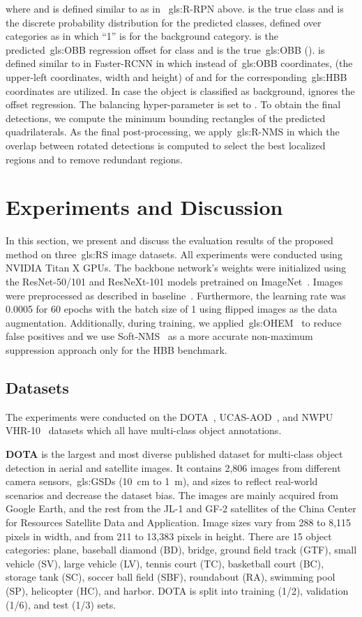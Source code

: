 \documentclass[runningheads]{llncs}
\begin{document}
	where  and  is defined similar to  as in ~\gls{gls:R-RPN} above.
     is the true class and  is the discrete probability distribution for the predicted classes, defined over  categories as  in which ``1'' is for the background category.
	 is the predicted~\gls{gls:OBB} regression offset for class  and  is the true~\gls{gls:OBB} ().
     is defined similar to  in Faster-RCNN in which instead of~\gls{gls:OBB} coordinates,  (the upper-left coordinates, width and height) of  and  for the corresponding~\gls{gls:HBB} coordinates are utilized.
	In case the object is classified as background,  ignores the offset regression.
    The balancing hyper-parameter  is set to .
	To obtain the final detections, we compute the minimum bounding rectangles of the predicted quadrilaterals.
    As the final post-processing, we apply~\gls{gls:R-NMS} in which the overlap between rotated detections is computed to select the best localized regions and to remove redundant regions.
    	\section{Experiments and Discussion}\label{sec:experiments}
	In this section, we present and discuss the evaluation results of the proposed method on three~\gls{gls:RS} image datasets.
    All experiments were conducted using NVIDIA Titan X GPUs.
The backbone network's weights were initialized using the ResNet-50/101 and ResNeXt-101 models pretrained on ImageNet~\cite{Deng2009}.
	Images were preprocessed as described in baseline~\cite{dota}. Furthermore, the learning rate was 0.0005 for 60 epochs with the batch size of 1 using flipped images as the data augmentation.
    Additionally, during training, we applied~\gls{gls:OHEM}~\cite{AbhinavShrivastava2016} to reduce false positives and we use Soft-NMS~\cite{softnms} as a more accurate non-maximum suppression approach only for the HBB benchmark.
		\subsection{Datasets}
	The experiments were conducted on the DOTA~\cite{dota}, UCAS-AOD~\cite{Zhu2015OrientationRO}, and NWPU VHR-10~\cite{Chengnwhu} datasets which all have multi-class object annotations. 
    
\textbf{DOTA} is the largest and most diverse published dataset for multi-class object detection in aerial and satellite images.
	It contains 2,806 images from different camera sensors,~\glspl{gls:GSD} (\SI{10}{\cm} to \SI{1}{\m}), and sizes to reflect real-world scenarios and decrease the dataset bias. The images are mainly acquired from Google Earth, and the rest from the JL-1 and GF-2 satellites of the China Center for Resources Satellite Data and Application.
    Image sizes vary from 288 to 8,115 pixels in width, and from 211 to 13,383 pixels in height.
	There are 15 object categories: plane, baseball diamond (BD), bridge, ground field track (GTF), small vehicle (SV), large vehicle (LV), tennis  court (TC), basketball court (BC), storage tank (SC), soccer ball field (SBF), roundabout (RA), swimming  pool (SP), helicopter (HC), and harbor.
	DOTA is split into training (1/2), validation (1/6), and test (1/3) sets.
	
\end{document}
